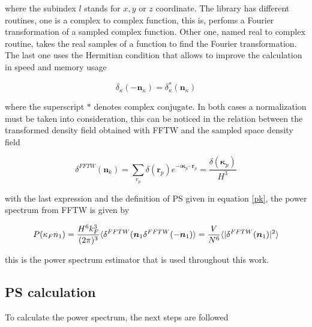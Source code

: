 where the subindex $l$ stands for $x,y$ or $z$ coordinate. 
The library has different routines, one is a complex to complex function, this is, perfoms a 
Fourier transformation of a sampled complex function. Other one, named real to complex routine, 
takes the real samples of a function to find the Fourier transformation. The last one 
uses the Hermitian condition that allows to improve the calculation in speed and memory 
usage

\[\delta_\kappa(-\textbf{n}_\kappa) = \delta_\kappa^*(\textbf{n}_\kappa)\]

where the superscript $*$ denotes complex conjugate. In both cases a normalization 
must be taken into consideration, this can be noticed in the relation between the transformed 
density field obtained with FFTW and the sampled space density field 

\[\delta^{FFTW}(\textbf{n}_k) = \sum_{r_p} \delta(\textbf{r}_p)e^{-i\boldsymbol{\kappa}_p\cdot \boldsymbol{r}_p} = \frac{\delta(\boldsymbol{\kappa}_p)}{H^3}\]

with the last expression and the definition of PS given in equation \ref{pk}, the power
spectrum from FFTW is given by \cite{Djeong}

\begin{equation}
P(\kappa_F n_1) = \frac{H^6 k^3_F}{(2\pi)^3}\langle\delta^{FFTW}(\mbox{\boldmath$n$}_1\delta^{FFTW}(-\mbox{\boldmath$n$}_1)\rangle = \frac{V}{N^6}\langle|\delta^{FFTW}(\mbox{\boldmath$n$}_1)|^2\rangle
\end{equation} 

this is the power spectrum estimator that is used throughout this work. 

\subsection{PS calculation}

To calculate the power spectrum, the next steps are followed

